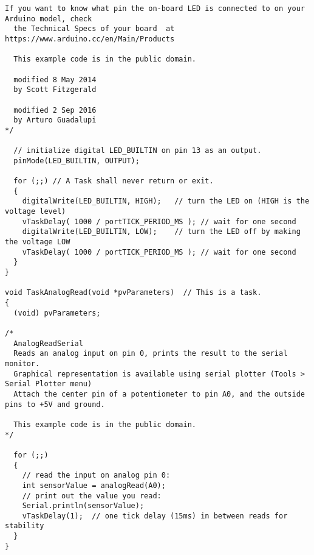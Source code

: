\documentclass[a4paper,12pt]{report}
\begin{document}
\begin{lstlisting}[style=CStyle]
  If you want to know what pin the on-board LED is connected to on your Arduino model, check
  the Technical Specs of your board  at https://www.arduino.cc/en/Main/Products
  
  This example code is in the public domain.

  modified 8 May 2014
  by Scott Fitzgerald
  
  modified 2 Sep 2016
  by Arturo Guadalupi
*/

  // initialize digital LED_BUILTIN on pin 13 as an output.
  pinMode(LED_BUILTIN, OUTPUT);

  for (;;) // A Task shall never return or exit.
  {
    digitalWrite(LED_BUILTIN, HIGH);   // turn the LED on (HIGH is the voltage level)
    vTaskDelay( 1000 / portTICK_PERIOD_MS ); // wait for one second
    digitalWrite(LED_BUILTIN, LOW);    // turn the LED off by making the voltage LOW
    vTaskDelay( 1000 / portTICK_PERIOD_MS ); // wait for one second
  }
}

void TaskAnalogRead(void *pvParameters)  // This is a task.
{
  (void) pvParameters;
  
/*
  AnalogReadSerial
  Reads an analog input on pin 0, prints the result to the serial monitor.
  Graphical representation is available using serial plotter (Tools > Serial Plotter menu)
  Attach the center pin of a potentiometer to pin A0, and the outside pins to +5V and ground.

  This example code is in the public domain.
*/

  for (;;)
  {
    // read the input on analog pin 0:
    int sensorValue = analogRead(A0);
    // print out the value you read:
    Serial.println(sensorValue);
    vTaskDelay(1);  // one tick delay (15ms) in between reads for stability
  }
}
\end{lstlisting}
\end{document}
